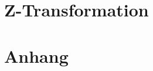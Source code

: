 \documentclass[a4paper]{article}
\begin{document}
\part{Z-Transformation}




\part{Anhang}






\end{document}
